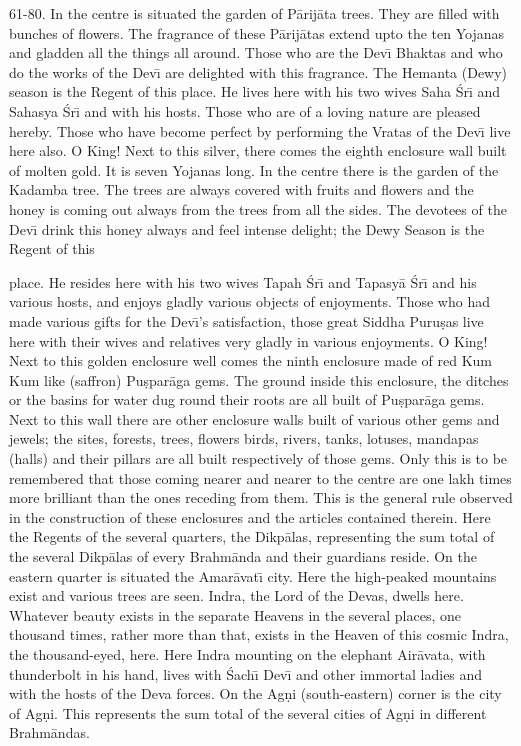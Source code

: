 61-80. In the centre is situated the garden of P\=arij\=ata trees. They are filled with bunches of flowers. The fragrance of these P\=arij\=atas extend upto the ten Yojanas and gladden all the things all around. Those who are the Dev\={\i} Bhaktas and who do the works of the Dev\={\i} are delighted with this fragrance. The Hemanta (Dewy) season is the Regent of this place. He lives here with his two wives Saha \'Sr\={\i} and Sahasya \'Sr\={\i} and with his hosts. Those who are of a loving nature are pleased hereby. Those who have become perfect by performing the Vratas of the Dev\={\i} live here also. O King! Next to this silver, there comes the eighth enclosure wall built of molten gold. It is seven Yojanas long. In the centre there is the garden of the Kadamba tree. The trees are always covered with fruits and flowers and the honey is coming out always from the trees from all the sides. The devotees of the Dev\={\i} drink this honey always and feel intense delight; the Dewy Season is the Regent of this

place. He resides here with his two wives Tapah \'Sr\={\i} and Tapasy\=a \'Sr\={\i} and his various hosts, and enjoys gladly various objects of enjoyments. Those who had made various gifts for the Dev\={\i}'s satisfaction, those great Siddha Puru\d{s}as live here with their wives and relatives very gladly in various enjoyments. O King! Next to this golden enclosure well comes the ninth enclosure made of red Kum Kum like (saffron) Pu\d{s}par\=aga gems. The ground inside this enclosure, the ditches or the basins for water dug round their roots are all built of Pu\d{s}par\=aga gems. Next to this wall there are other enclosure walls built of various other gems and jewels; the sites, forests, trees, flowers birds, rivers, tanks, lotuses, mandapas (halls) and their pillars are all built respectively of those gems. Only this is to be remembered that those coming nearer and nearer to the centre are one lakh times more brilliant than the ones receding from them. This is the general rule observed in the construction of these enclosures and the articles contained therein. Here the Regents of the several quarters, the Dikp\=alas, representing the sum total of the several Dikp\=alas of every Brahm\=anda and their guardians reside. On the eastern quarter is situated the Amar\=avat\={\i} city. Here the high-peaked mountains exist and various trees are seen. Indra, the Lord of the Devas, dwells here. Whatever beauty exists in the separate Heavens in the several places, one thousand times, rather more than that, exists in the Heaven of this cosmic Indra, the thousand-eyed, here. Here Indra mounting on the elephant Air\=avata, with thunderbolt in his hand, lives with \'Sach\={\i} Dev\={\i} and other immortal ladies and with the hosts of the Deva forces. On the Ag\d{n}i (south-eastern) corner is the city of Ag\d{n}i. This represents the sum total of the several cities of Ag\d{n}i in different Brahm\=andas.

